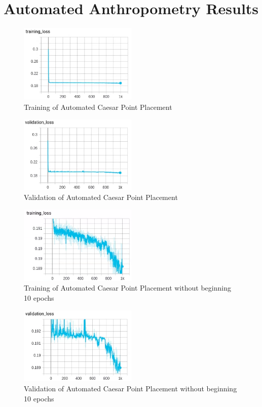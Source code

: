 \section{Automated Anthropometry Results}

\begin{figure}[!htb]
	\caption{Training of Automated Caesar Point Placement}
	\centering
\includegraphics[width=0.5\textwidth]{images/training.png}
\end{figure}
\begin{figure}[!htb]
	\caption{Validation of Automated Caesar Point Placement}
	\centering
\includegraphics[width=0.5\textwidth]{images/validation.png}
\end{figure}
 \begin{figure}[!htb]
	\caption{Training of Automated Caesar Point Placement without beginning 10 epochs}
	\centering
\includegraphics[width=0.5\textwidth]{images/train_close.png}
\end{figure}
\begin{figure}[!htb]
	\caption{Validation of Automated Caesar Point Placement without beginning 10 epochs}
	\centering
\includegraphics[width=0.5\textwidth]{images/val_close.png}
\end{figure}


